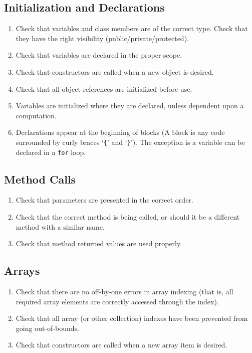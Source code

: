 \subsection*{Initialization and Declarations}\begin{enumerate}[resume, label=C\arabic*., ref=C\arabic*]
\item \checklistref Check that variables and class members are of the correct type. Check that they have the right visibility (public/private/protected).
\item \checklistref Check that variables are declared in the proper scope.
\item \checklistref Check that constructors are called when a new object is desired.
\item \checklistref Check that all object references are initialized before use.
\item \checklistref Variables are initialized where they are declared, unless dependent upon a computation.
\item \checklistref Declarations appear at the beginning of blocks (A block is any code surrounded by curly braces `\texttt{\{}' and `\texttt{\}}'). The exception is a variable can be declared in a \texttt{for} loop.
\end{enumerate}

\subsection*{Method Calls}\begin{enumerate}[resume, label=C\arabic*., ref=C\arabic*]
\item \checklistref Check that parameters are presented in the correct order.
\item \checklistref Check that the correct method is being called, or should it be a different method with a similar name.
\item \checklistref Check that method returned values are used properly.
\end{enumerate}

\subsection*{Arrays}\begin{enumerate}[resume, label=C\arabic*., ref=C\arabic*]
\item \checklistref Check that there are no off-by-one errors in array indexing (that is, all required array elements are correctly accessed through the index).
\item \checklistref Check that all array (or other collection) indexes have been prevented from going out-of-bounds.
\item \checklistref Check that constructors are called when a new array item is desired.
\end{enumerate}

